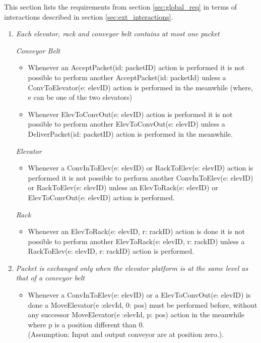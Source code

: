 
This section lists the requirements from section \ref{sec:global_req} in terms of interactions described in section \ref{sec:ext_interactions}.

\begin{enumerate}
\item \textit{Each elevator, rack and conveyor belt contains at most one packet}

	\textit{Conveyor Belt}
	\begin{itemize}
	\item
	Whenever an AcceptPacket(id: packetID) action is performed it
	is not possible to perform another AcceptPacket(id:
	packetId) unless a ConvToElevator(e: elevID) action is
	performed in the meanwhile (where, e can be one of the two elevators)
	\item Whenever ElevToConvOut(e: elevID) action is performed it is
	not possible to perform another ElevToConvOut(e: 
	elevID) unless a DeliverPacket(id: packetID) action is performed in the meanwhile.
	\end{itemize}
	\textit{Elevator}
	\begin{itemize}
	\item Whenever a ConvInToElev(e: elevID) or RackToElev(e: elevID) 
	action is performed it is not possible to perform another
	ConvInToElev(e: elevID) or RackToElev(e: elevID) unless an 
	ElevToRack(e: elevID) or ElevToConvOut(e: elevID) action is performed.
	\end{itemize}
	
	\textit{Rack}
	\begin{itemize}
	\item Whenever an ElevToRack(e: elevID, r: rackID) action is done it is not
	possible to perform another ElevToRack(e: elevID, r: rackID) unless a RackToElev(e: elevID, r: rackID) action is performed.%
	\end{itemize}

\item \textit{ Packet is exchanged only when the elevator platform is at
the same level as that of a conveyor belt}
	\begin{itemize}
	\item Whenever a ConvInToElev(e: elevID) or a ElevToConvOut(e: 
	elevID) is done a MoveElevator(e :elevId, 0: pos) must be
	performed before, without any successor MoveElevator(e :elevId, p: pos) action in the meanwhile where p is a position different than 0.\\(Assumption: Input and output conveyor are at
	position zero.).	
	\end{itemize}


\end{enumerate}
